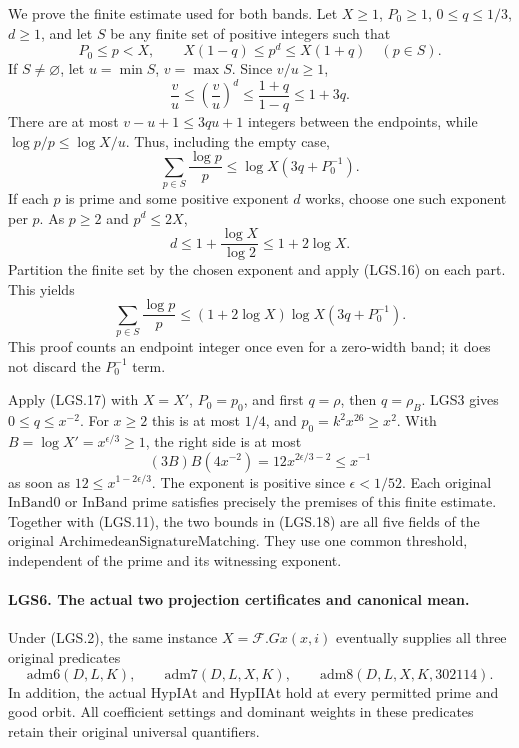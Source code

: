 \documentclass[11pt,a4paper]{article}
\numberwithin{equation}{section}
\theoremstyle{remark}\newtheorem{remark}[theorem]{Remark}
\begin{document}
We prove the finite estimate used for both bands.  Let
\(X\ge1\), \(P_0\ge1\), \(0\le q\le1/3\), \(d\ge1\), and
let \(S\) be any finite set of positive integers such that
\[
 P_0\le p<X,\qquad X(1-q)\le p^d\le X(1+q)
                       \quad(p\in S).
 \]
If \(S\ne\varnothing\), let \(u=\min S\), \(v=\max S\).
Since \(v/u\ge1\),
\[
 \frac vu\le\left(\frac vu\right)^d
       \le\frac{1+q}{1-q}\le1+3q.
 \]
There are at most \(v-u+1\le3qu+1\) integers between the
endpoints, while \(\log p/p\le\log X/u\).
Thus, including the empty case,
\[
             \sum_{p\in S}\frac{\log p}{p}
                 \le\log X(3q+P_0^{-1}).             \tag{LGS.16}
\]
If each \(p\) is prime and some positive exponent \(d\) works,
choose one such exponent per \(p\).  As \(p\ge2\) and
\(p^d\le2X\),
\[
       d\le1+\frac{\log X}{\log2}\le1+2\log X.
 \]
Partition the finite set by the chosen exponent and apply
(LGS.16) on each part.  This yields
\[
 \sum_{p\in S}\frac{\log p}{p}
       \le(1+2\log X)\log X(3q+P_0^{-1}).             \tag{LGS.17}
\]
This proof counts an endpoint integer once even for a
zero-width band; it does not discard the \(P_0^{-1}\) term.

Apply (LGS.17) with \(X=X'\), \(P_0=p_0\), and first
\(q=\rho\), then \(q=\rho_B\).  LGS3 gives
\(0\le q\le x^{-2}\).  For \(x\ge2\) this is at most \(1/4\),
and \(p_0=k^2x^{26}\ge x^2\).  With
\(B=\log X'=x^{\epsilon/3}\ge1\), the right side is at most
\[
       (3B)B(4x^{-2})=12x^{2\epsilon/3-2}\le x^{-1}
                                                               \tag{LGS.18}
\]
as soon as \(12\le x^{1-2\epsilon/3}\).
The exponent is positive since \(\epsilon<1/52\).
Each original \(\mathrm{InBand0}\) or \(\mathrm{InBand}\)
prime satisfies precisely the premises of this finite
estimate.  Together with (LGS.11), the two bounds in
(LGS.18) are all five fields of the original
\(\mathrm{ArchimedeanSignatureMatching}\).
They use one common threshold, independent of the prime
and its witnessing exponent.

\paragraph{LGS6. The actual two projection certificates and canonical mean.}
\label{claim:LGS6}
Under (LGS.2), the same instance \(X=\mathcal F.Gx(x,i)\)
eventually supplies all three original predicates
\[
 \mathrm{adm6}(D,L,K),\qquad
 \mathrm{adm7}(D,L,X,K),\qquad
 \mathrm{adm8}(D,L,X,K,302114).                         \tag{LGS.19}
\]
In addition, the actual \(\mathrm{HypIAt}\) and
\(\mathrm{HypIIAt}\) hold at every permitted prime and good
orbit.  All coefficient settings and dominant weights in
these predicates retain their original universal quantifiers.
\end{document}
